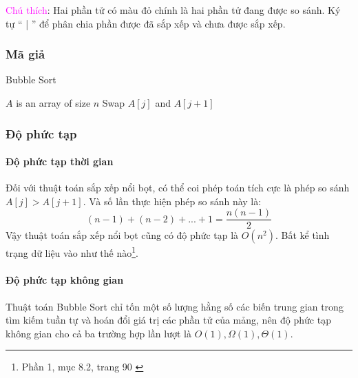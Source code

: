 \textcolor{magenta}{Chú thích}: Hai phần tử có màu đỏ chính là hai phần tử đang được so sánh. Ký tự “ | ” để phân chia phần được đã sắp xếp và chưa được sắp xếp.

\subsubsection{Mã giả}
 
\begin{algorithm}[H]
\caption{Bubble Sort}
\label{alg:bubble-sort}
\begin{algorithmic}

\Require $A$ is an array of size $n$
 
     
         
            \State Swap $A[j]$ and $A[j+1]$ 
        \EndIf
    \EndFor
\EndFor
\EndFunction

\end{algorithmic}
\end{algorithm}

\subsubsection{Độ phức tạp}
 
\paragraph{Độ phức tạp thời gian}

Đối với thuật toán sắp xếp nổi bọt, có thể coi phép toán tích cực là phép so sánh $A[j] > A[j + 1]$. Và số lần thực hiện phép so sánh này là:
$$(n-1)+(n-2)+...+1 = \frac{n(n-1)}{2}$$
Vậy thuật toán sắp xếp nổi bọt cũng có độ phức tạp là $O(n^2)$. Bất kể tình trạng dữ liệu vào như thế nào\footnote{Phần 1, mục 8.2, trang 90 \cite{hoang1999giaithuat}}. 

\paragraph{Độ phức tạp không gian}
Thuật toán Bubble Sort chỉ tốn một số lượng hằng số các biến trung gian trong tìm kiếm tuần tự và hoán đổi giá trị các phần tử của mảng, nên độ phức tạp không gian cho cả ba trường hợp lần lượt là $O(1), \Omega(1), \Theta(1)$.


